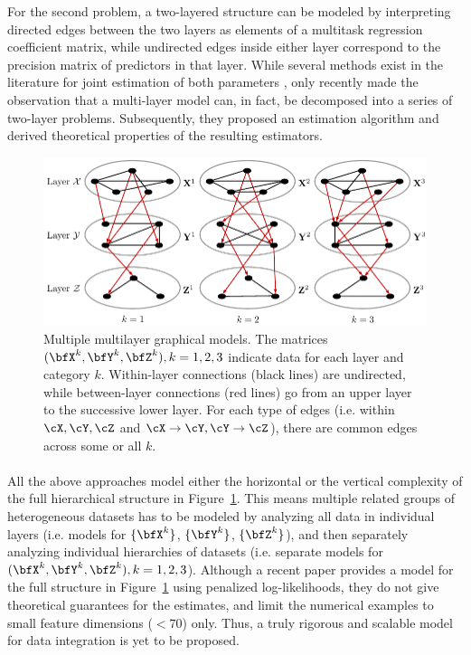 For the second problem, a two-layered structure can be modeled by interpreting directed edges between the two layers as elements of a multitask regression coefficient matrix, while undirected edges inside either layer correspond to the precision matrix of predictors in that layer. While several methods exist in the literature for joint estimation of both parameters \citep{RothmanEtal10, LeeLiu12, CaiEtal12}, only recently \cite{LinEtal16} made the observation that a multi-layer model can, in fact, be decomposed into a series of two-layer problems. Subsequently, they proposed an estimation algorithm and derived theoretical properties of the resulting estimators.

\begin{figure}
\centering
\includegraphics[]{multi2layer}
\caption{Multiple multilayer graphical models. The matrices $(\bfX^k, \bfY^k, \bfZ^k), k = 1,2,3$ indicate data for each layer and category $k$. Within-layer connections (black lines) are undirected, while between-layer connections (red lines) go from an upper layer to the successive lower layer. For each type of edges (i.e. within $\cX, \cY, \cZ$ and $\cX \rightarrow \cY, \cY \rightarrow \cZ$), there are common edges across some or all $k$. }
\label{fig:multi2layer}
\end{figure}

\paragraph{}
All the above approaches model either the horizontal or the vertical complexity of the full hierarchical structure in Figure~\ref{fig:multi2layer}. This means multiple related groups of heterogeneous datasets has to be modeled by analyzing all data in individual layers (i.e. models for $\{ \bfX^k \}$, $\{ \bfY^k \}$, $\{ \bfZ^k \}$), and then separately analyzing individual hierarchies of datasets (i.e. separate models for $(\bfX^k, \bfY^k, \bfZ^k), k = 1,2,3$). Although a recent paper \citep{ZhangOuyangZhao17} provides a model for the full structure in Figure~\ref{fig:multi2layer} using penalized log-likelihoods, they do not give theoretical guarantees for the estimates, and limit the numerical examples to small feature dimensions ($<70$) only. Thus, a truly rigorous and scalable model for data integration is yet to be proposed.


